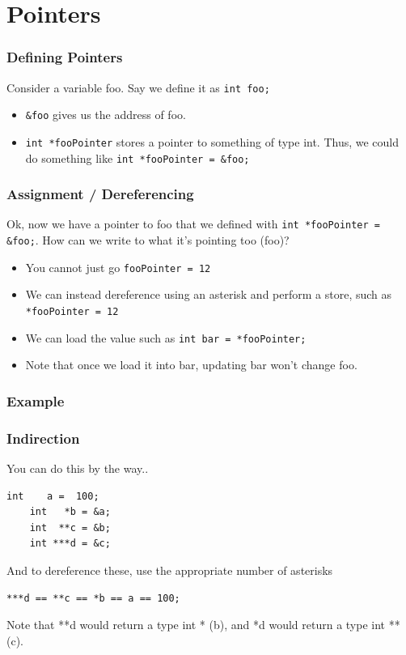 \documentclass{beamer}
\begin{document}
\section{Pointers}
\begin{frame}
  \frametitle{Defining Pointers}
  Consider a variable foo. Say we define it as \texttt{int foo;}
  \begin{itemize}
    \item \texttt{\&foo} gives us the address of foo.
    \item \texttt{int *fooPointer} stores a pointer to something of type int. Thus, we could do something like \texttt{int *fooPointer = \&foo;}
  \end{itemize}
\end{frame}
\begin{frame}
  \frametitle{Assignment / Dereferencing}
  Ok, now we have a pointer to foo that we defined with \texttt{int *fooPointer = \&foo;}. How can we write to what it's pointing too (foo)?
  \begin{itemize}
    \item You cannot just go \texttt{fooPointer = 12}
    \item We can instead dereference using an asterisk and perform a store, such as \texttt{*fooPointer = 12}
    \item We can load the value such as \texttt{int bar = *fooPointer;}
    \item Note that once we load it into bar, updating bar won't change foo.
  \end{itemize}
\end{frame}
\begin{frame}
  \frametitle{Example}
  
\end{frame}
\begin{frame}[fragile]
  \frametitle{Indirection}
  You can do this by the way..
  \begin{lstlisting}[style=customc]
    int    a =  100;
    int   *b = &a;
    int  **c = &b;
    int ***d = &c;
  \end{lstlisting}
  And to dereference these, use the appropriate number of asterisks
  \begin{lstlisting}[style=customc]
    ***d == **c == *b == a == 100;
  \end{lstlisting}
  Note that **d would return a type int * (b), and *d would return a type int ** (c).
\end{frame}
\end{document}
